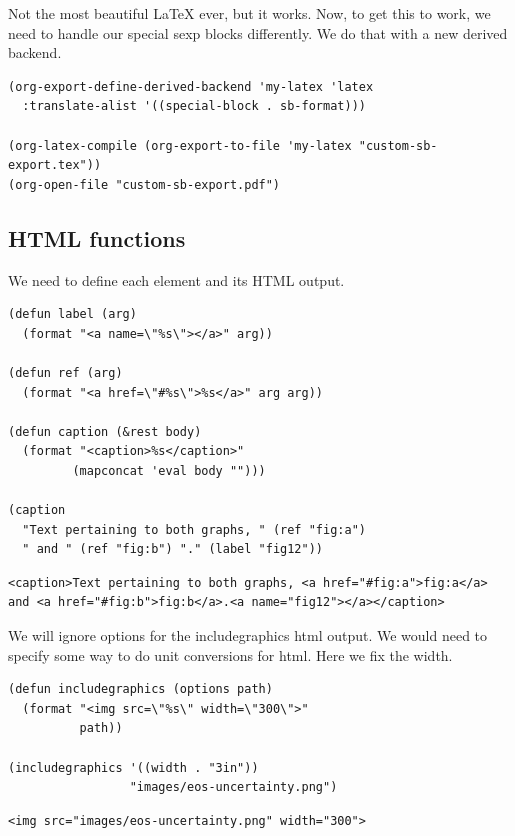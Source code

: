 \documentclass[11pt]{article}
\begin{document}
Not the most beautiful \LaTeX{} ever, but it works. Now, to get this to work, we need to handle our special sexp blocks differently. We do that with a new derived backend.

\begin{verbatim}
(org-export-define-derived-backend 'my-latex 'latex
  :translate-alist '((special-block . sb-format)))

(org-latex-compile (org-export-to-file 'my-latex "custom-sb-export.tex"))
(org-open-file "custom-sb-export.pdf")
\end{verbatim}

\subsection{HTML functions}
\label{sec-1-2}
We need to define each element and its HTML output.
\begin{verbatim}
(defun label (arg)
  (format "<a name=\"%s\"></a>" arg))

(defun ref (arg)
  (format "<a href=\"#%s\">%s</a>" arg arg))

(defun caption (&rest body)
  (format "<caption>%s</caption>"
         (mapconcat 'eval body "")))

(caption
  "Text pertaining to both graphs, " (ref "fig:a")
  " and " (ref "fig:b") "." (label "fig12"))
\end{verbatim}

\begin{verbatim}
<caption>Text pertaining to both graphs, <a href="#fig:a">fig:a</a> and <a href="#fig:b">fig:b</a>.<a name="fig12"></a></caption>
\end{verbatim}


We will ignore options for the includegraphics html output. We would need to specify some way to do unit conversions for html. Here we fix the width.
\begin{verbatim}
(defun includegraphics (options path)
  (format "<img src=\"%s\" width=\"300\">"
          path))

(includegraphics '((width . "3in"))
                 "images/eos-uncertainty.png")
\end{verbatim}

\begin{verbatim}
<img src="images/eos-uncertainty.png" width="300">
\end{verbatim}
\end{document}

